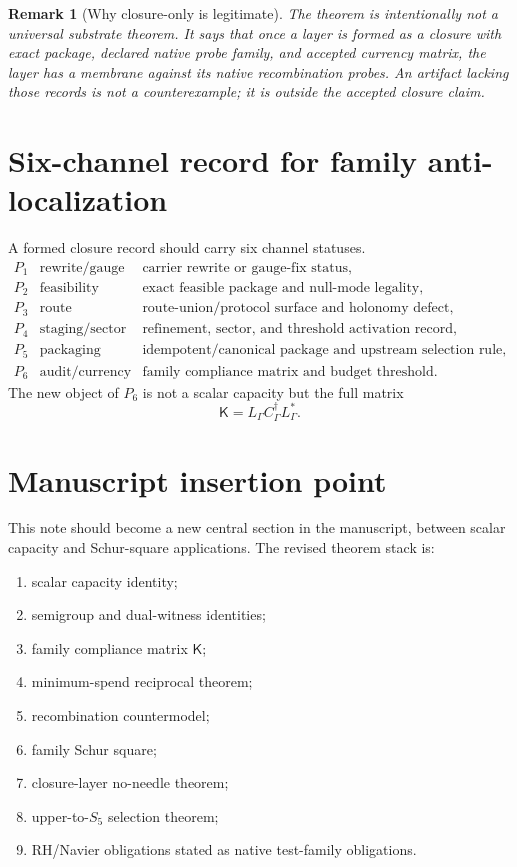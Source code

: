 \documentclass[11pt]{article}
\newtheorem{remark}{Remark}
\begin{document}
\begin{remark}[Why closure-only is legitimate]
The theorem is intentionally not a universal substrate theorem.  It says that once a layer is formed as a closure with exact package, declared native probe family, and accepted currency matrix, the layer has a membrane against its native recombination probes.  An artifact lacking those records is not a counterexample; it is outside the accepted closure claim.
\end{remark}

\section{Six-channel record for family anti-localization}
A formed closure record should carry six channel statuses.
\[
\begin{array}{lll}
P_1 & \text{rewrite/gauge} & \text{carrier rewrite or gauge-fix status},\\
P_2 & \text{feasibility} & \text{exact feasible package and null-mode legality},\\
P_3 & \text{route} & \text{route-union/protocol surface and holonomy defect},\\
P_4 & \text{staging/sector} & \text{refinement, sector, and threshold activation record},\\
P_5 & \text{packaging} & \text{idempotent/canonical package and upstream selection rule},\\
P_6 & \text{audit/currency} & \text{family compliance matrix and budget threshold}.
\end{array}
\]
The new object of $P_6$ is not a scalar capacity but the full matrix
\[
        \mathsf K=L_\Gamma C_\Gamma^\dagger L_\Gamma^*.
\]

\section{Manuscript insertion point}
This note should become a new central section in the manuscript, between scalar capacity and Schur-square applications.  The revised theorem stack is:
\begin{enumerate}[label=\textbf{T\arabic*.}]
\item scalar capacity identity;
\item semigroup and dual-witness identities;
\item family compliance matrix $\mathsf K$;
\item minimum-spend reciprocal theorem;
\item recombination countermodel;
\item family Schur square;
\item closure-layer no-needle theorem;
\item upper-to-$S_5$ selection theorem;
\item RH/Navier obligations stated as native test-family obligations.
\end{enumerate}
\end{document}
